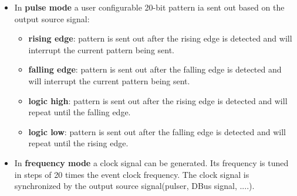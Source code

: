 \documentclass[12pt,a4paper]{article}
\begin{document}
\begin{itemize}
\item 
	In \textbf{pulse mode} a user configurable 20-bit pattern ia sent out based on the output source signal:
	
	\begin{itemize}
		\item
		  \textbf{rising edge}: pattern is sent out
		  after the rising edge is detected and will interrupt the current
		  pattern being sent.
		\item
		  \textbf{falling edge}: pattern is sent out
		  after the falling edge is detected and will interrupt the current
		  pattern being sent.
		\item
		  \textbf{logic high}: pattern is sent out after
		  the rising edge is detected and will repeat until the falling edge.
		\item
		  \textbf{logic low}: pattern is sent out after
		  the falling edge is detected and will repeat until the rising edge.
		\end{itemize}
	
	
\item 
	In \textbf{frequency mode} a clock signal can be generated. Its frequency is tuned in steps of 20 times the event clock frequency.  The clock signal is synchronized by the output source signal(pulser, DBus signal, ....). 
	

\end{itemize}
\end{document}
